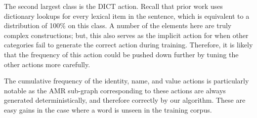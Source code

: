 \documentclass[11pt]{article}
\newcommand\w[1]{\textit{#1}} %
\begin{document}
The second largest class is the DICT action.
Recall that prior work uses dictionary lookups for every lexical item in the
  sentence, which is equivalent to a distribution of 100\% on this class.
A number of the elements here are truly complex constructions; but, this also
  serves as the implicit action for when other categories fail to generate the
  correct action during training.
Therefore, it is likely that the frequency of this action could be pushed down
  further by tuning the other actions more carefully.

The cumulative frequency of the identity, name, and value actions is particularly 
  notable as the AMR sub-graph corresponding to these actions are
  always generated deterministically, and therefore correctly by our algorithm.
These are easy gains in the case where a word is unseen in the
  training corpus.







%
%
\end{document}

